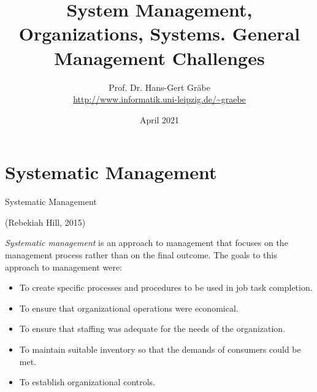 \documentclass{beamer}
\title{System Management, Organizations, Systems. General Management Challenges}
\author{Prof. Dr. Hans-Gert Gräbe\\
\url{http://www.informatik.uni-leipzig.de/~graebe}}
\date{April 2021}
\begin{document}
{
\begin{frame}
  \titlepage
\end{frame}}

\section{Systematic Management}
\begin{frame}{Systematic Management}

  (Rebekiah Hill, 2015)

  \emph{Systematic management} is an approach to management that focuses on the
management process rather than on the final outcome. The goals to this
approach to management were:
\begin{itemize}
\item To create specific processes and procedures to be used in job task
  completion.
\item To ensure that organizational operations were economical.
\item To ensure that staffing was adequate for the needs of the organization.
\item To maintain suitable inventory so that the demands of consumers could be
  met.
\item To establish organizational controls. 
\end{itemize}
\end{frame}
  
\end{document}
